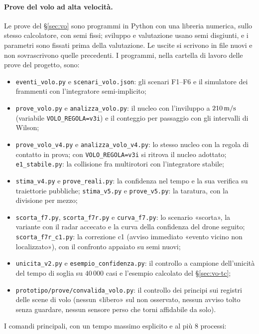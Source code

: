 \sloppy\paragraph{Prove del volo ad alta velocità.} Le prove del \S\ref{sec:vo} sono programmi in Python con una libreria numerica, sullo stesso calcolatore, con semi fissi; sviluppo e valutazione usano semi disgiunti, e i parametri sono fissati prima della valutazione. Le uscite si scrivono in file nuovi e non sovrascrivono quelle precedenti. I programmi, nella cartella di lavoro delle prove del progetto, sono:
\begin{itemize}
\item \texttt{eventi\_volo.py} e \texttt{scenari\_volo.json}: gli scenari F1--F6 e il simulatore dei frammenti con l'integratore semi-implicito;
\item \texttt{prove\_volo.py} e \texttt{analizza\_volo.py}: il nucleo con l'inviluppo a $210\,\mathrm{m/s}$ (variabile \texttt{VOLO\_REGOLA=v3i}) e il conteggio per passaggio con gli intervalli di Wilson;
\item \texttt{prove\_volo\_v4.py} e \texttt{analizza\_volo\_v4.py}: lo stesso nucleo con la regola di contatto in prova; con \texttt{VOLO\_REGOLA=v3i} si ritrova il nucleo adottato; \texttt{e1\_stabile.py}: la collisione fra multirotori con l'integratore stabile;
\item \texttt{stima\_v4.py} e \texttt{prove\_reali.py}: la confidenza nel tempo e la sua verifica su traiettorie pubbliche; \texttt{stima\_v5.py} e \texttt{prove\_v5.py}: la taratura, con la divisione per mezzo;
\item \texttt{scorta\_f7.py}, \texttt{scorta\_f7r.py} e \texttt{curva\_f7.py}: lo scenario «scorta», la variante con il radar accecato e la curva della confidenza del drone seguito; \texttt{scorta\_f7r\_c1.py}: la correzione c1 (avviso immediato «evento vicino non localizzato»), con il confronto appaiato su semi nuovi;
\item \texttt{unicita\_v2.py} e \texttt{esempio\_confidenza.py}: il controllo a campione dell'unicità del tempo di soglia su $40\,000$ casi e l'esempio calcolato del \S\ref{sec:vo-tc};
\item \texttt{prototipo/prove/convalida\_volo.py}: il controllo dei principi sui registri delle scene di volo (nessun «libero» sul non osservato, nessun avviso tolto senza guardare, nessun sensore perso che torni affidabile da solo).
\end{itemize}
I comandi principali, con un tempo massimo esplicito e al più 8 processi:
